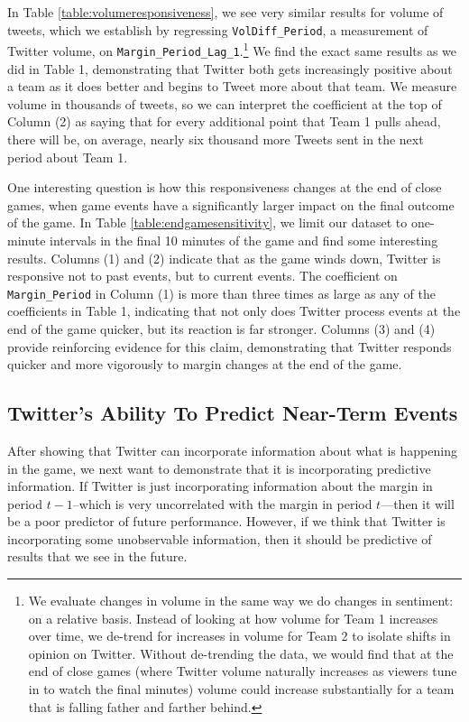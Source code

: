 \documentclass[12pt]{article}
\begin{document}
\begin{doublespacing}
In Table \ref{table:volumeresponsiveness}, we see very similar results for volume of tweets,
which we establish by regressing \texttt{VolDiff\_Period}, a measurement of Twitter volume, on \texttt{Margin\_Period\_Lag\_1}.\footnote{We evaluate changes in volume in the same way we do changes in sentiment: on a relative basis. Instead of looking at how volume for Team 1 increases over time, we de-trend for increases in volume for Team 2 to isolate shifts in opinion on Twitter. Without de-trending the data, we would find that at the end of close games (where Twitter volume naturally increases as viewers tune in to watch the final minutes) volume could increase substantially for a team that is falling father and farther behind.} We find the exact same results as we did in Table 1, demonstrating that Twitter both gets increasingly positive about a team as it does better and begins to Tweet more about that team. We measure volume in thousands of tweets, so we can interpret the coefficient at the top of Column (2) as saying that for every additional point that Team 1 pulls ahead, there will be, on average, nearly six thousand more Tweets sent in the next period about Team 1. 

One interesting question is how this responsiveness changes at the end of close games, when game events have a significantly larger impact on the final outcome of the game. In Table \ref{table:endgamesensitivity}, we limit our dataset to one-minute intervals in the final 10 minutes of the game and find some interesting results. Columns (1) and (2) indicate that as the game winds down, Twitter is responsive not to past events, but to current events. The coefficient on \texttt{Margin\_Period} in Column (1) is more than three times as large as any of the coefficients in Table 1, indicating that not only does Twitter process events at the end of the game quicker, but its reaction is far stronger. Columns (3) and (4) provide reinforcing evidence for this claim, demonstrating that Twitter responds quicker and more vigorously to margin changes at the end of the game. 

\subsection{Twitter's Ability To Predict Near-Term Events}

After showing that Twitter can incorporate information about what is happening in the game, we next want to demonstrate that it is incorporating predictive information. If Twitter is just incorporating information about the margin in period $t-1$--which is very uncorrelated with the margin in period $t$---then it will be a poor predictor of future performance. However, if we think that Twitter is incorporating some unobservable information, then it should be predictive of results that we see in the future. 


\end{doublespacing}
\end{document}
